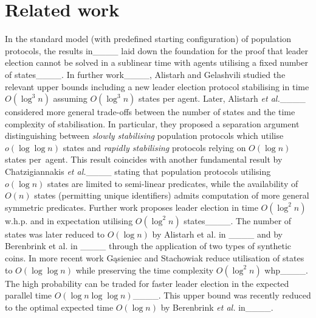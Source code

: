 \section{Related work}
%
In the standard model (with predefined starting configuration) of population protocols, the results in____ laid down the foundation for the proof that leader election cannot be solved in a sublinear time with agents utilising a fixed number of states____.
In further work____, Alistarh and Gelashvili studied the relevant upper bounds including 
a new leader election protocol stabilising in time $O(\log^3 n)$ assuming $O(\log^3 n)$ states per agent.
%
Later, Alistarh {\em et al.}____ considered more general trade-offs between the number of states and the time complexity of stabilisation.
%
In particular, they proposed a separation argument distinguishing between {\em slowly stabilising} population protocols 
which utilise $o(\log\log n)$ states and {\em rapidly stabilising} protocols relying on $O(\log n)$ states per~agent. 
This result coincides with another fundamental result by Chatzigiannakis {\em et al.}____ 
stating that population protocols utilising $o(\log n)$ states are limited to semi-linear predicates,
while the availability of $O(n)$ states (permitting unique identifiers) admits computation of more general symmetric predicates.
%
Further work proposes leader election in time 
$O(\log^2 n)$ w.h.p. and in expectation utilising $O(\log^2 n)$ states____. 
The number of states was later reduced to $O(\log n)$ by
Alistarh et al. in ____ and by Berenbrink et al. in ____ through the application of two types of synthetic coins.
%
In more recent work G\k asieniec and Stachowiak reduce utilisation of states to $O(\log\log n)$ while preserving the time complexity $O(\log^2 n)$ whp____.
The high probability can be traded for faster leader election in the expected parallel time $O(\log n\log\log n)$____. This upper bound was recently reduced to the optimal expected time $O(\log n)$ by Berenbrink {\em et al.} in____. 

